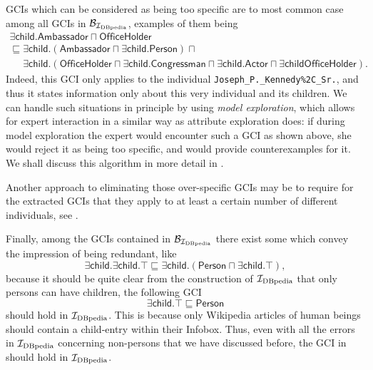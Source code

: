 GCIs which can be considered as being too specific are to most common case among all GCIs
in $\mathcal{B}_{{\mathcal{I}_{\text{DBpedia}}}}$, examples of them being
\begin{gather*}
  \mathsf{\exists child. Ambassador \sqcap OfficeHolder} \\
  \sqsubseteq \mathsf{\exists child. (Ambassador \sqcap \exists child. Person) \sqcap {}}\\
  \phantom{\sqsubseteq{}} \mathsf{\exists child. (OfficeHolder \sqcap \exists child.
  Congressman \sqcap \exists child. Actor \sqcap \exists child OfficeHolder)}.
\end{gather*}
Indeed, this GCI only applies to the individual \texttt{Joseph\_P.\_Kennedy\%2C\_Sr.}, and
thus it states information only about this very individual and its children.  We can
handle such situations in principle by using \emph{model exploration}, which allows for
expert interaction in a similar way as attribute exploration does: if during model
exploration the expert would encounter such a GCI as shown above, she would reject it as
being too specific, and would provide counterexamples for it.  We shall discuss this
algorithm in more detail in .

Another approach to eliminating those over-specific GCIs may be to require for the
extracted GCIs that they apply to at least a certain number of different individuals, see
.

Finally, among the GCIs contained in $\mathcal{B}_{\mathcal{I}_{\text{DBpedia}}}$ there exist some which convey
the impression of being redundant, like
\begin{equation*}
  \mathsf{\exists child. \exists child. \top \sqsubseteq \exists child. (Person \sqcap \exists child. \top)},
\end{equation*}
because it should be quite clear from the construction of ${\mathcal{I}_{\text{DBpedia}}}$ that only persons
can have children, \ie the following GCI
\begin{equation}
  \label{eq:23}
  \mathsf{\exists child. \top \sqsubseteq Person}
\end{equation}
should hold in ${\mathcal{I}_{\text{DBpedia}}}$.  This is because only Wikipedia articles of human beings
should contain a child-entry within their Infobox.  Thus, even with all the errors in
${\mathcal{I}_{\text{DBpedia}}}$ concerning non-persons that we have discussed before, the GCI in 
should hold in ${\mathcal{I}_{\text{DBpedia}}}$.

